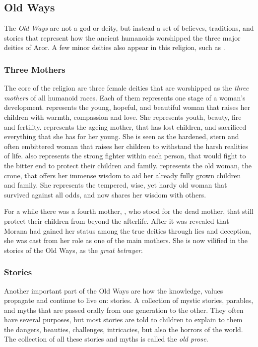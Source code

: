\subsection{Old Ways}
\label{sec:Old Ways}

The \emph{Old Ways} are not a god or deity, but instead a set of believes,
traditions, and stories that represent how the ancient humanoids worshipped
the three major deities of Aror. A few minor deities also appear in this
religion, such as .

\subsubsection{Three Mothers}
\label{sec:Three Mothers}

The core of the religion are three female deities that are worshipped as the
\emph{three mothers} of all humanoid races. Each of them represents one stage
of a woman's development.  represents the young, hopeful,
and beautiful woman that raises her children with warmth, compassion and
love. She represents youth, beauty, fire and fertility. 
represents the ageing mother, that has lost children, and sacrificed
everything that she has for her young. She is seen as the hardened, stern and
often embittered woman that raises her children to withstand the harsh
realities of life.  also represents the strong fighter
within each person, that would fight to the bitter end to protect their
children and family.  represents the old woman, the crone,
that offers her immense wisdom to aid her already fully grown children and
family. She represents the tempered, wise, yet hardy old woman that survived
against all odds, and now shares her wisdom with others.

For a while there was a fourth mother, , who stood for the
dead mother, that still protect their children from beyond the afterlife.
After it was revealed that Morana had gained her status among the true deities
through lies and deception, she was cast from her role as one of the main
mothers. She is now vilified in the stories of the Old Ways, as the
\emph{great betrayer}.

\subsubsection{Stories}

Another important part of the Old Ways are how the knowledge, values propagate
and continue to live on: stories. A collection of mystic stories, parables,
and myths that are passed orally from one generation to the other. They often
have several purposes, but most stories are told to children to explain to
them the dangers, beauties, challenges, intricacies, but also the horrors of
the world. The collection of all these stories and myths is called the
\emph{old prose}.

